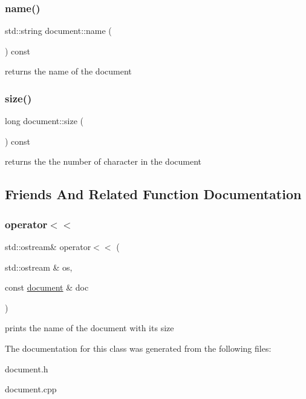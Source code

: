 \subsubsection{\texorpdfstring{name()}{name()}}
{\footnotesize\ttfamily std\+::string document\+::name (\begin{DoxyParamCaption}{ }\end{DoxyParamCaption}) const}

returns the name of the document \mbox{\label{classdocument_aee0dba5f11baeb3b7da786bdd320a576}} 
\subsubsection{\texorpdfstring{size()}{size()}}
{\footnotesize\ttfamily long document\+::size (\begin{DoxyParamCaption}{ }\end{DoxyParamCaption}) const}

returns the the number of character in the document 

\subsection{Friends And Related Function Documentation}
\mbox{\label{classdocument_af474a7f5ba29bca5df031898e86a8687}} 
\subsubsection{\texorpdfstring{operator$<$$<$}{operator<<}}
{\footnotesize\ttfamily std\+::ostream\& operator$<$$<$ (\begin{DoxyParamCaption}\item[{std\+::ostream \&}]{os,  }\item[{const \hyperlink{classdocument}{document} \&}]{doc }\end{DoxyParamCaption})\hspace{0.3cm}{\ttfamily [friend]}}

prints the name of the document with its size 

The documentation for this class was generated from the following files\+:\begin{DoxyCompactItemize}
\item 
document.\+h\item 
document.\+cpp\end{DoxyCompactItemize}
